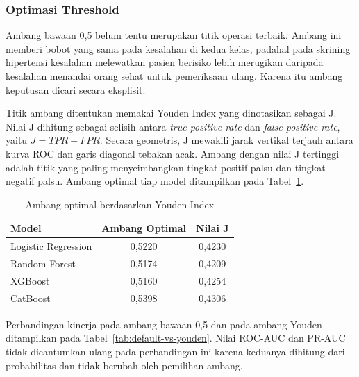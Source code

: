 \subsubsection{Optimasi Threshold}
\label{subsec:threshold}
Ambang bawaan 0,5 belum tentu merupakan titik operasi terbaik. Ambang ini memberi bobot yang sama pada kesalahan di kedua kelas, padahal pada skrining hipertensi kesalahan melewatkan pasien berisiko lebih merugikan daripada kesalahan menandai orang sehat untuk pemeriksaan ulang. Karena itu ambang keputusan dicari secara eksplisit.

Titik ambang ditentukan memakai Youden Index yang dinotasikan sebagai J. Nilai J dihitung sebagai selisih antara \emph{true positive rate} dan \emph{false positive rate}, yaitu $J = TPR - FPR$. Secara geometris, J mewakili jarak vertikal terjauh antara kurva ROC dan garis diagonal tebakan acak. Ambang dengan nilai J tertinggi adalah titik yang paling menyeimbangkan tingkat positif palsu dan tingkat negatif palsu. Ambang optimal tiap model ditampilkan pada Tabel~\ref{tab:threshold-optimal}.

\begin{table}[H]
\centering
\caption{Ambang optimal berdasarkan Youden Index}
\label{tab:threshold-optimal}
\begin{tabular}{lcc}
\toprule
\textbf{Model} & \textbf{Ambang Optimal} & \textbf{Nilai J} \\
\midrule
Logistic Regression & 0,5220 & 0,4230 \\
Random Forest       & 0,5174 & 0,4209 \\
XGBoost             & 0,5160 & 0,4254 \\
CatBoost            & 0,5398 & 0,4306 \\
\bottomrule
\end{tabular}
\end{table}

Perbandingan kinerja pada ambang bawaan 0,5 dan pada ambang Youden ditampilkan pada Tabel~\ref{tab:default-vs-youden}. Nilai ROC-AUC dan PR-AUC tidak dicantumkan ulang pada perbandingan ini karena keduanya dihitung dari probabilitas dan tidak berubah oleh pemilihan ambang.

